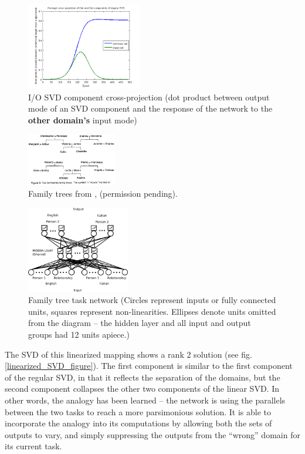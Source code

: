 \documentclass[10pt,letterpaper]{article}
\begin{document}
\begin{figure}
\centering
\includegraphics[width=0.45\textwidth]{figures/SVD_cross_projection_learning.png}
\caption{I/O SVD component cross-projection (dot product between output mode of an SVD component and the response of the network to the \textbf{other domain's} input mode)}
\label{SVD_cross_projection_learning}
\end{figure}
\begin{figure}
\centering
\includegraphics[width=0.35\textwidth]{figures/hinton_family_tree_figure.png}
\caption{Family trees from \citet{Hinton1986}, (permission pending).}
\label{hinton_family_tree_figure}
\end{figure}
\begin{figure}
\centering
\includegraphics[width=0.4\textwidth]{figures/family_tree_network_diagram.png}
\caption{Family tree task network (Circles represent inputs or fully connected units, squares represent non-linearities. Ellipses denote units omitted from the diagram -- the hidden layer and all input and output groups had 12 units apiece.)}
\label{family_tree_network_diagram}
\end{figure}
The SVD of this linearized mapping shows a rank 2 solution (see fig. \ref{linearized_SVD_figure}). The first component is similar to the first component of the regular SVD, in that it reflects the separation of the domains, but the second component collapses the other two components of the linear SVD. In other words, the analogy has been learned -- the network is using the parallels between the two tasks to reach a more parsimonious solution. It is able to incorporate the analogy into its computations by allowing both the sets of outputs to vary, and simply suppressing the outputs from the ``wrong'' domain for its current task.\par
\end{document}
